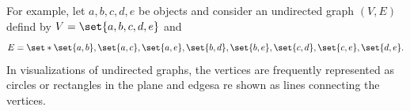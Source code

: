 For example, let $a, b, c, d, e$ be objects and consider an undirected graph $(V, E)$ defind by
$V = \set{a, b, c, d, e}$
and
$$
  E = \set*{\set{a, b}, \set{a, c}, \set{a, e}, \set{b, d}, \set{b, e}, \set{c, d}, \set{c, e}, \set{d,e}}.
$$
In visualizations of undirected graphs, the vertices are frequently represented as circles or rectangles in the plane and edgesa re shown as lines connecting the vertices.

